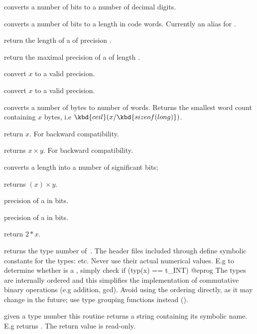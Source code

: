  converts a number of bits to a number of
decimal digits.

 converts a number of bits to a length
in code words. Currently  an alias for .

 return the length of a  of precision
.

 return the maximal precision of a 
of length .

 convert $x$ to a valid precision.

 convert $x$ to a valid precision.

 converts a number of bytes to number of
words. Returns the smallest word count containing $x$ bytes, i.e
$\kbd{ceil}(x / \kbd{sizeof(long)})$.

 return $x$. For backward compatibility.

 returns
$x\times y$. For backward compatibility.

 converts a length into a number
of significant bits;

 returns
$(x)\times y$.

 precision of a  in bits.

 precision of a  in bits.

 return $2*x$.


 returns the type number of~. The header files
included through  define symbolic constants for the 
types:  etc. Never use their actual numerical values. E.g to determine
whether  is a , simply check
\bprog
  if (typ(x) == t_INT) { }
@eprog\noindent
The types are internally ordered and this simplifies the implementation of
commutative binary operations (e.g addition, gcd). Avoid using the ordering
directly, as it may change in the future; use type grouping functions
instead ().

 given a type number  this routine
returns a string containing its symbolic name. E.g 
returns . The return value is read-only.

